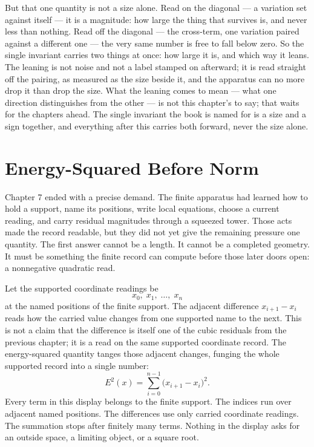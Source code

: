 But that one quantity is not a size alone. Read on the diagonal --- a variation set against itself --- it is a magnitude: how large the thing that survives is, and never less than nothing. Read off the diagonal --- the cross-term, one variation paired against a different one --- the very same number is free to fall below zero. So the single invariant carries two things at once: how large it is, and which way it leans. The leaning is not noise and not a label stamped on afterward; it is read straight off the pairing, as measured as the size beside it, and the apparatus can no more drop it than drop the size. What the leaning comes to mean --- what one direction distinguishes from the other --- is not this chapter's to say; that waits for the chapters ahead. The single invariant the book is named for is a size and a sign together, and everything after this carries both forward, never the size alone.

\section{Energy-Squared Before Norm}

Chapter 7 ended with a precise demand. The finite apparatus had learned how
to hold a support, name its positions, write local equations, choose a current
reading, and carry residual magnitudes through a squeezed tower. Those acts
made the record readable, but they did not yet give the remaining pressure one
quantity. The first answer cannot be a length. It cannot be a completed
geometry. It must be something the finite record can compute before those
later doors open: a nonnegative quadratic read.

Let the supported coordinate readings be
\[
  x_0,\;x_1,\;\ldots,\;x_n
\]
at the named positions of the finite support. The adjacent difference
\(x_{i+1}-x_i\) reads how the carried value changes from one supported name
to the next. This is not a claim that the difference is itself one of the
cubic residuals from the previous chapter; it is a read on the same supported
coordinate record. The energy-squared quantity tanges those adjacent changes,
funging the whole supported record into a single number:
\[
  E^2(x)
    =
  \sum_{i=0}^{n-1} \bigl(x_{i+1}-x_i\bigr)^2 .
\]
Every term in this display belongs to the finite support. The indices run
over adjacent named positions. The differences use only carried coordinate
readings. The summation stops after finitely many terms. Nothing in the
display asks for an outside space, a limiting object, or a square root.

